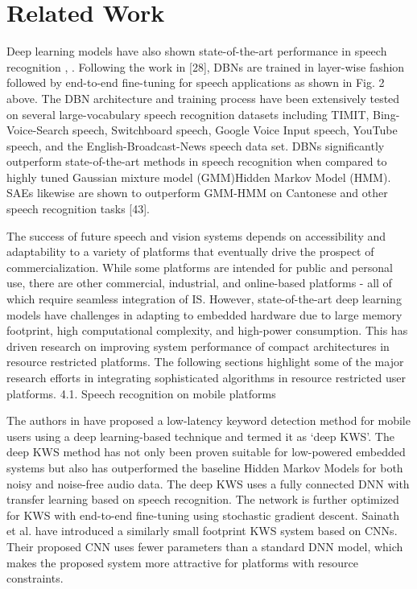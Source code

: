 
\section{Related Work}

Deep learning models have also shown state-of-the-art performance in speech recognition \cite{hinton2012deep}, \cite{sainath2013deep}. Following the work in [28], DBNs are trained in layer-wise fashion followed by end-to-end fine-tuning for speech applications as shown in Fig. 2 above. The DBN architecture and training process have been extensively tested on several large-vocabulary speech recognition datasets including TIMIT, Bing-Voice-Search speech, Switchboard speech, Google Voice Input speech, YouTube speech, and the English-Broadcast-News speech data set. DBNs significantly outperform state-of-the-art methods in speech recognition when compared to highly tuned Gaussian mixture model (GMM)Hidden Markov Model (HMM). SAEs likewise are shown to outperform GMM-HMM on Cantonese and other speech recognition tasks [43].


The success of future speech and vision systems depends on accessibility and adaptability to a variety of platforms that eventually drive the prospect of commercialization. While some platforms are intended for public and personal use, there are other commercial, industrial, and online-based platforms - all of which require seamless integration of IS. However, state-of-the-art deep learning models have challenges in adapting to embedded hardware due to large memory footprint, high computational complexity, and high-power consumption. This has driven research on improving system performance of compact architectures in resource restricted platforms. The following sections highlight some of the major research efforts in integrating sophisticated algorithms in resource restricted user platforms.
4.1. Speech recognition on mobile platforms


The authors in \cite{chen2014small} have proposed a low-latency keyword detection method for mobile users using a deep learning-based technique and termed it as ‘deep KWS’. The deep KWS method has not only been proven suitable for low-powered embedded systems but also has outperformed the baseline Hidden Markov Models for both noisy and noise-free audio data. The deep KWS uses a fully connected DNN with transfer learning  based on speech recognition. The network is further optimized for KWS with end-to-end fine-tuning using stochastic gradient descent. Sainath et al. \cite{sainath2015convolutional} have introduced a similarly small footprint KWS system based on CNNs. Their proposed CNN uses fewer parameters than a standard DNN model, which makes the proposed system more attractive for platforms with resource constraints. 

